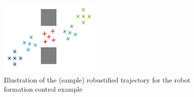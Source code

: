 \begin{figure}[t]
	\centering
	\includegraphics[width=0.45\textwidth]{figures/formation.pdf}
	\caption{Illustration of the (sample) robustified trajectory for the robot formation control example}
\end{figure}\label{fig:formation_ex}
 
%




